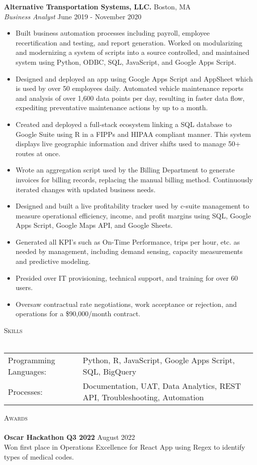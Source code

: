 \documentclass[a4paper]{article}
\newcommand{\lineunder} {
    \vspace*{-8pt} \\
    \hspace*{-18pt} \hrulefill \\
}
\newcommand{\header} [1] {
    {\hspace*{-18pt}\vspace*{6pt} \textsc{#1}}
    \vspace*{-6pt} \lineunder
}
\begin{document}
\textbf{Alternative Transportation Systems, LLC.} \hfill Boston, MA\\
\textit{Business Analyst} \hfill June 2019 - November 2020\\
\vspace{-1mm}
\begin{itemize} \itemsep 1pt
	\item Built business automation processes including payroll, employee recertification and testing, and report generation. Worked on modularizing and modernizing a system of scripts into a source controlled, and maintained system using Python, ODBC, SQL, JavaScript, and Google Apps Script.
	\item Designed and deployed an app using Google Apps Script and AppSheet which is used by over 50 employees daily. Automated vehicle maintenance reports and analysis of over 1,600 data points per day, resulting in faster data flow, expediting preventative maintenance actions by up to a month.
	\item Created and deployed a full-stack ecosystem linking a SQL database to Google Suite using R in a FIPPs and HIPAA compliant manner. This system displays live geographic information and driver shifts used to manage 50+ routes at once.
	\item Wrote an aggregation script used by the Billing Department to generate invoices for billing records, replacing the manual billing method. Continuously iterated changes with updated business needs.
	\item Designed and built a live profitability tracker used by c-suite management to measure operational efficiency, income, and profit margins using SQL, Google Apps Script, Google Maps API, and Google Sheets.
	\item Generated all KPI’s such as On-Time Performance, trips per hour, etc. as needed by management, including demand sensing, capacity measurements and predictive modeling.
	\item Presided over IT provisioning, technical support, and training for over 60 users.
	\item Oversaw contractual rate negotiations, work acceptance or rejection, and operations for a \$90,000/month contract.
\end{itemize}



\header{Skills}
\begin{tabular}{ l l }
	Programming Languages: & Python, R, JavaScript, Google Apps Script, SQL, BigQuery \\
    Processes: & Documentation, UAT, Data Analytics, REST API, Troubleshooting, Automation \\
\end{tabular}
\vspace{2mm}


\header{Awards}
\textbf{Oscar Hackathon Q3 2022} \hfill August 2022\\
Won first place in Operations Excellence for React App using Regex to identify types of medical codes. 
\vspace*{2mm}

\ 
\end{document}
